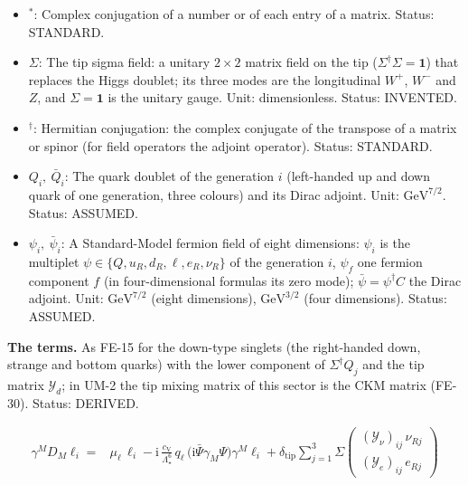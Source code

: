 \documentclass[
  10pt,
]{article}
\begin{document}
\begin{itemize}
  \(i, j\)); on the static block they become the tip mixing matrices
  \(\mathcal{K}\) (the normalisation of that relation is not fixed:
  OPEN). Unit: dimensionless. Status: INVENTED.
\item
  \({}^*\): Complex conjugation of a number or of each entry of a
  matrix. Status: STANDARD.
\item
  \(\Sigma\): The tip sigma field: a unitary \(2 \times 2\) matrix field
  on the tip (\(\Sigma^\dagger\Sigma = \mathbf{1}\)) that replaces the
  Higgs doublet; its three modes are the longitudinal \(W^+\), \(W^-\)
  and \(Z\), and \(\Sigma = \mathbf{1}\) is the unitary gauge. Unit:
  dimensionless. Status: INVENTED.
\item
  \({}^\dagger\): Hermitian conjugation: the complex conjugate of the
  transpose of a matrix or spinor (for field operators the adjoint
  operator). Status: STANDARD.
\item
  \(Q_i,\ \bar Q_i\): The quark doublet of the generation \(i\)
  (left-handed up and down quark of one generation, three colours) and
  its Dirac adjoint. Unit: \(\mathrm{GeV}^{7/2}\). Status: ASSUMED.
\item
  \(\psi_i,\ \bar\psi_i\): A Standard-Model fermion field of eight
  dimensions: \(\psi_i\) is the multiplet
  \(\psi \in \{Q, u_R, d_R, \ell, e_R, \nu_R\}\) of the generation
  \(i\), \(\psi_f\) one fermion component \(f\) (in four-dimensional
  formulas its zero mode); \(\bar\psi = \psi^\dagger C\) the Dirac
  adjoint. Unit: \(\mathrm{GeV}^{7/2}\) (eight dimensions),
  \(\mathrm{GeV}^{3/2}\) (four dimensions). Status: ASSUMED.
\end{itemize}

\textbf{The terms.} As FE-15 for the down-type singlets (the
right-handed down, strange and bottom quarks) with the lower component
of \(\Sigma^\dagger Q_j\) and the tip matrix \(\mathcal{Y}_d\); in UM-2
the tip mixing matrix of this sector is the CKM matrix (FE-30). Status:
DERIVED.

\[
\begin{aligned}
\gamma^MD_M\ell_i ={}& \mu_\ell\,\ell_i - \mathrm{i}\,\frac{c_{\mathrm{V}}}{\Lambda_\star^6}\,q_\ell\,
 \big(\mathrm{i}\bar\Psi\gamma_M\Psi\big)\gamma^M\ell_i
 + \delta_{\mathrm{tip}}\sum_{j=1}^{3}\Sigma\begin{pmatrix}(\mathcal{Y}_\nu)_{ij}\,\nu_{Rj}\\ (
 \mathcal{Y}_e)_{ij}\,e_{Rj}\end{pmatrix}
\end{aligned} \tag{FE-17}
\]
\end{document}
